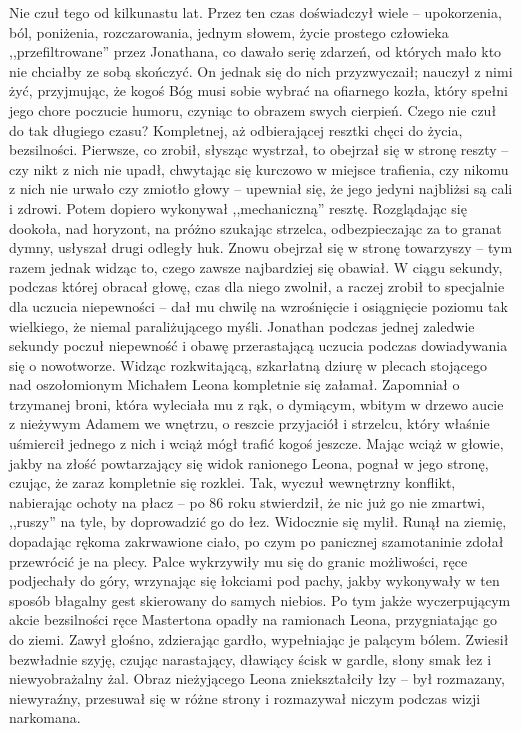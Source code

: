 \documentclass[../MAIN.tex]{subfiles}
\begin{document}
Nie czuł tego od kilkunastu lat.
Przez ten czas doświadczył wiele -- upokorzenia, ból, poniżenia, rozczarowania, jednym słowem, życie prostego człowieka ,,przefiltrowane'' przez Jonathana, co dawało serię zdarzeń, od których mało kto nie chciałby ze sobą skończyć. On jednak się do nich przyzwyczaił; nauczył z nimi żyć, przyjmując, że kogoś Bóg musi sobie wybrać na ofiarnego kozła, który spełni jego chore poczucie humoru, czyniąc to obrazem swych cierpień. Czego nie czuł do tak długiego czasu?
Kompletnej, aż odbierającej resztki chęci do życia, bezsilności.
Pierwsze, co zrobił, słysząc wystrzał, to obejrzał się w stronę reszty -- czy nikt z nich nie upadł, chwytając się kurczowo w miejsce trafienia, czy nikomu z nich nie urwało czy zmiotło głowy -- upewniał się, że jego jedyni najbliżsi są cali i zdrowi. Potem dopiero wykonywał ,,mechaniczną'' resztę.
Rozglądając się dookoła, nad horyzont, na próżno szukając strzelca, odbezpieczając za to granat dymny, usłyszał drugi odległy huk. Znowu obejrzał się w stronę towarzyszy -- tym razem jednak widząc to, czego zawsze najbardziej się obawiał.
W ciągu sekundy, podczas której obracał głowę, czas dla niego zwolnił, a raczej zrobił to specjalnie dla uczucia niepewności -- dał mu chwilę na wzrośnięcie i osiągnięcie poziomu tak wielkiego, że niemal paraliżującego myśli. Jonathan podczas jednej zaledwie sekundy poczuł niepewność i obawę przerastającą uczucia podczas dowiadywania się o nowotworze.
Widząc rozkwitającą, szkarłatną dziurę w plecach stojącego nad oszołomionym Michałem Leona kompletnie się załamał. Zapomniał o trzymanej broni, która wyleciała mu z rąk, o dymiącym, wbitym w drzewo aucie z nieżywym Adamem we wnętrzu, o reszcie przyjaciół i strzelcu, który właśnie uśmiercił jednego z nich i wciąż mógł trafić kogoś jeszcze. Mając wciąż w głowie, jakby na złość powtarzający się widok ranionego Leona, pognał w jego stronę, czując, że zaraz kompletnie się rozklei. Tak, wyczuł wewnętrzny konflikt, nabierając ochoty na płacz -- po 86 roku stwierdził, że nic już go nie zmartwi, ,,ruszy'' na tyle, by doprowadzić go do łez. Widocznie się mylił.
Runął na ziemię, dopadając rękoma zakrwawione ciało, po czym po panicznej szamotaninie zdołał przewrócić je na plecy.
Palce wykrzywiły mu się do granic możliwości, ręce podjechały do góry, wrzynając się łokciami pod pachy, jakby wykonywały w ten sposób błagalny gest skierowany do samych niebios. Po tym jakże wyczerpującym akcie bezsilności ręce Mastertona opadły na ramionach Leona, przygniatając go do ziemi. Zawył głośno, zdzierając gardło, wypełniając je palącym bólem. Zwiesił bezwładnie szyję, czując narastający, dławiący ścisk w gardle, słony smak łez i niewyobrażalny żal. Obraz nieżyjącego Leona zniekształciły łzy -- był rozmazany, niewyraźny, przesuwał się w różne strony i rozmazywał niczym podczas wizji narkomana.
\end{document}

